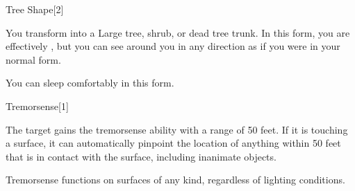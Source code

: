 \begin{spellsection}{Tree Shape}[2]
    \begin{spellheader}
    \end{spellheader}
    \begin{spellcontent}
        \begin{spelltargetinginfo}
        \end{spelltargetinginfo}
        \begin{spelleffects}
            \spelleffect You transform into a Large tree, shrub, or dead tree trunk. In this form, you are effectively \paralyzed, but you can see around you in any direction as if you were in your normal form.
            \spelldur \durext \dismissable
        \end{spelleffects}
    \end{spellcontent}
    \begin{spellfooter}
        \spellnotes You can sleep comfortably in this form.
        \miscastexplode
    \end{spellfooter}
\end{spellsection}

\begin{spellsection}{Tremorsense}[1]
    \begin{spellheader}
    \end{spellheader}
    \begin{spellcontent}
        \begin{spelltargetinginfo}
        \end{spelltargetinginfo}
        \begin{spelleffects}
            \spelleffect The target gains the tremorsense ability with a range of 50 feet. If it is touching a surface, it can automatically pinpoint the location of anything within 50 feet that is in contact with the surface, including inanimate objects.
            \spelldur \durpersonallong
        \end{spelleffects}
    \end{spellcontent}
    \begin{spellfooter}
        \spellnotes Tremorsense functions on surfaces of any kind, regardless of lighting conditions.
        \miscastexplode
    \end{spellfooter}
\end{spellsection}

